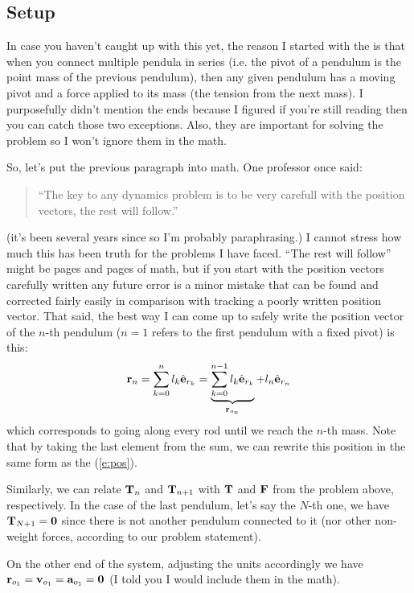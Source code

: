 \documentclass{article}
\begin{document}
\subsection{Setup}
In case you haven't caught up with this yet, the reason I started with the \ntsp is that when you connect multiple pendula in series (i.e. the pivot of a pendulum is the point mass of the previous pendulum), then any given pendulum has a moving pivot and a force applied to its mass (the tension from the next mass). I purposefully didn't mention the ends because I figured if you're still reading then you can catch those two exceptions. Also, they are important for solving the problem so I won't ignore them in the math.

So, let's put the previous paragraph into math. One professor once said: 
\begin{quote}
  ``The key to any dynamics problem is to be very carefull with the position vectors, the rest will follow.''
\end{quote}
(it's been several years since so I'm probably paraphrasing.) I cannot stress how much this has been truth for the problems I have faced. ``The rest will follow'' might be pages and pages of math, but if you start with the position vectors carefully written any future error is a minor mistake that can be found and corrected fairly easily in comparison with tracking a poorly written position vector. That said, the best way I can come up to safely write the position vector of the $n$-th pendulum ($n=1$ refers to the first pendulum with a fixed pivot) is this:
\begin{equation}
  \mathbf{r}_n=\sum_{k=0}^{n}l_k\hat{\mathbf{e}}_{r_{k}}=\underbrace{\sum_{k=0}^{n-1}l_k\hat{\mathbf{e}}_{r_{k}}}_{\mathbf{r}_{o_{n}}}+l_n\hat{\mathbf{e}}_{r_{n}}
\end{equation}
which corresponds to going along every rod until we reach the $n$-th mass. Note that by taking the last element from the sum, we can rewrite this position in the same form as the \ntsp (\cref{e:pos}).

Similarly, we can relate $\mathbf{T}_{n}$ and $\mathbf{T}_{n+1}$ with $\mathbf{T}$ and $\mathbf{F}$ from the \ntsp problem above, respectively. In the case of the last pendulum, let's say the $N$-th one, we have $\mathbf{T}_{N+1}=\mathbf{0}$ since there is not another pendulum connected to it (nor other non-weight forces, according to our problem statement).

On the other end of the system, adjusting the units accordingly we have $\mathbf{r}_{o_{1}}=\mathbf{v}_{o_{1}}=\mathbf{a}_{o_{1}}=\mathbf{0}$ (I told you I would include them in the math).
\end{document}
